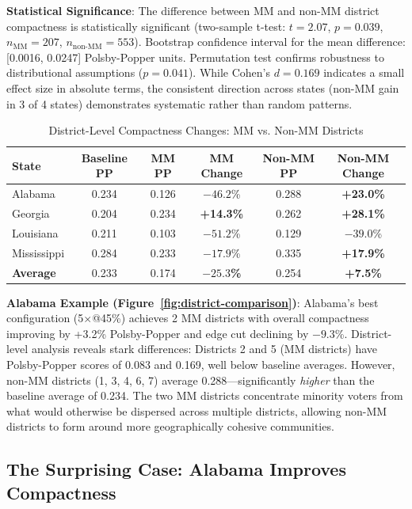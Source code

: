 \textbf{Statistical Significance}: The difference between MM and non-MM district compactness is statistically significant (two-sample t-test: $t = 2.07$, $p = 0.039$, $n_{\text{MM}} = 207$, $n_{\text{non-MM}} = 553$). Bootstrap confidence interval for the mean difference: [0.0016, 0.0247] Polsby-Popper units. Permutation test confirms robustness to distributional assumptions ($p = 0.041$). While Cohen's $d = 0.169$ indicates a small effect size in absolute terms, the consistent direction across states (non-MM gain in 3 of 4 states) demonstrates systematic rather than random patterns.

\begin{table}[htbp]
\centering
\caption{District-Level Compactness Changes: MM vs. Non-MM Districts}
\label{tab:mm-vs-nonmm-breakdown}
\begin{tabular}{lccccc}
\toprule
\textbf{State} & \textbf{Baseline PP} & \textbf{MM PP} & \textbf{MM Change} & \textbf{Non-MM PP} & \textbf{Non-MM Change} \\
\midrule
Alabama    & 0.234 & 0.126 & $-46.2$\% & 0.288 & \textbf{+23.0\%} \\
Georgia    & 0.204 & 0.234 & \textbf{+14.3\%} & 0.262 & \textbf{+28.1\%} \\
Louisiana  & 0.211 & 0.103 & $-51.2$\% & 0.129 & $-39.0$\% \\
Mississippi & 0.284 & 0.233 & $-17.9$\% & 0.335 & \textbf{+17.9\%} \\
\midrule
\textbf{Average} & 0.233 & 0.174 & \textbf{$-25.3$\%} & 0.254 & \textbf{+7.5\%} \\
\bottomrule
\end{tabular}
\end{table}

\textbf{Alabama Example (Figure~\ref{fig:district-comparison})}: Alabama's best configuration (5$\times$@45\%) achieves 2 MM districts with overall compactness improving by +3.2\% Polsby-Popper and edge cut declining by $-9.3$\%. District-level analysis reveals stark differences: Districts 2 and 5 (MM districts) have Polsby-Popper scores of 0.083 and 0.169, well below baseline averages. However, non-MM districts (1, 3, 4, 6, 7) average 0.288---significantly \emph{higher} than the baseline average of 0.234. The two MM districts concentrate minority voters from what would otherwise be dispersed across multiple districts, allowing non-MM districts to form around more geographically cohesive communities.

\subsection{The Surprising Case: Alabama Improves Compactness}

